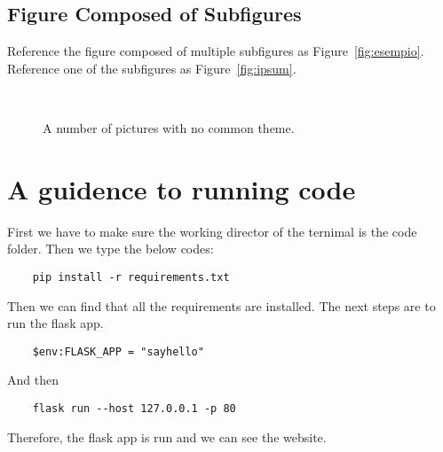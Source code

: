 \documentclass[
12pt, %
a4paper, %
oneside, %
headinclude,footinclude, %
BCOR5mm, %
]{scrartcl}
\begin{document}
\subsection{Figure Composed of Subfigures}

Reference the figure composed of multiple subfigures as Figure~\vref{fig:esempio}. Reference one of the subfigures as Figure~\vref{fig:ipsum}. %

\lipsum[15-18] %

\begin{figure}[tb]
\centering
{} \quad
{} \\
 \quad
{}
\caption[A number of pictures.]{A number of pictures with no common theme.} %
\label{fig:esempio}
\end{figure}


\renewcommand{\refname}{\spacedlowsmallcaps{References}} %


\clearpage



\clearpage
\appendix
\section{A guidence to running code}
First we have to make sure the working director of the ternimal is the code folder. Then we type the below codes:
\begin{lstlisting}
    pip install -r requirements.txt
\end{lstlisting}
Then we can find that all the requirements are installed. The next steps are to run the flask app. 
\begin{lstlisting}
    $env:FLASK_APP = "sayhello"
\end{lstlisting}
And then
\begin{lstlisting}
    flask run --host 127.0.0.1 -p 80
\end{lstlisting}
Therefore, the flask app is run and we can see the website.
\end{document}
